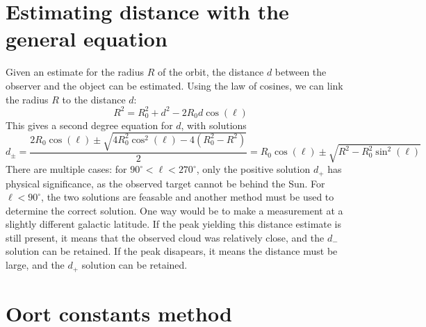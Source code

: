 \section{Estimating distance with the general equation}
\label{sec:distance_with_tangent_method}
Given an estimate for the radius $R$ of the orbit, the distance $d$ between the observer and the object can be estimated. Using the law of cosines, we can link the radius $R$ to the distance $d$:
\begin{equation}
    R^2 = R_0^2 + d^2 - 2 R_0 d \cos(\ell)
\end{equation}
This gives a second degree equation for $d$, with solutions
\begin{equation}
    d_\pm = \frac{2R_0 \cos(\ell) \pm \sqrt{4R_0^2 \cos^2(\ell) - 4(R_0^2 - R^2)}}{2} = R_0 \cos(\ell) \pm \sqrt{R^2 - R_0^2 \sin^2(\ell)}
\end{equation}
There are multiple cases: for $90^\circ < \ell < 270^\circ$, only the positive solution $d_+$ has physical significance, as the observed target cannot be behind the Sun. For $\ell < 90^\circ$, the two solutions are feasable and another method must be used to determine the correct solution. One way would be to make a measurement at a slightly different galactic latitude. If the peak yielding this distance estimate is still present, it means that the observed cloud was relatively close, and the $d_-$ solution can be retained. If the peak disapears, it means the distance must be large, and the $d_+$ solution can be retained.

\section{Oort constants method}
\label{sec:oort_method}

